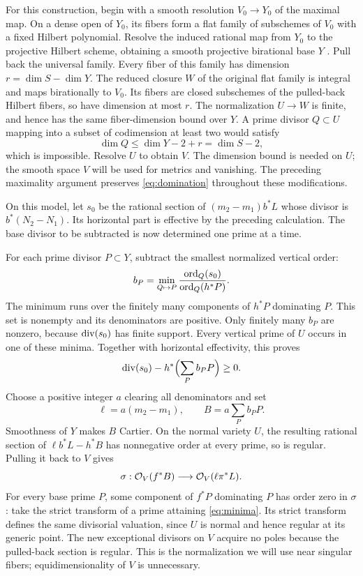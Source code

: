 For this construction, begin with a smooth resolution \(V_0\to Y_0\)
of the maximal map. On a dense open of \(Y_0\), its fibers form a
flat family of subschemes of \(V_0\) with a fixed Hilbert polynomial.
Resolve the induced rational map from \(Y_0\) to the projective
Hilbert scheme, obtaining a smooth projective birational base \(Y\)
\cite[Theorem~3.2, p.~260; p.~265]{Grothendieck1961Hilbert}.
Pull back the universal family. Every fiber of this family has
dimension \(r=\dim S-\dim Y\). The reduced closure \(W\) of the
original flat family is integral and maps birationally to \(V_0\).
Its fibers are closed subschemes of the pulled-back Hilbert fibers,
so have dimension at most \(r\). The normalization \(U\to W\)
is finite, and hence has the same fiber-dimension bound over \(Y\).
A prime divisor \(Q\subset U\) mapping into a subset of codimension
at least two would satisfy
\[
\dim Q\le \dim Y-2+r=\dim S-2,
\]
which is impossible. Resolve \(U\) to obtain \(V\). The dimension
bound is needed on \(U\); the smooth space \(V\) will be used for
metrics and vanishing. The preceding maximality argument preserves
\eqref{eq:domination} throughout these modifications.

On this model, let \(s_0\) be the rational section of
\((m_2-m_1)b^*L\) whose divisor is \(b^*(N_2-N_1)\). Its horizontal
part is effective by the preceding calculation. The base divisor to
be subtracted is now determined one prime at a time.

For each prime divisor \(P\subset Y\), subtract the smallest
normalized vertical order:
\begin{equation}\label{eq:minima}
b_P=\min_{Q\mapsto P}
\frac{\operatorname{ord}_Q(s_0)}{\operatorname{ord}_Q(h^*P)}.
\end{equation}
The minimum runs over the finitely many components of \(h^*P\)
dominating \(P\). This set is nonempty and its denominators are
positive. Only finitely many \(b_P\) are nonzero, because
\(\operatorname{div}(s_0)\) has finite support. Every vertical prime of \(U\)
occurs in one of these minima. Together with horizontal effectivity,
this proves
\[
\operatorname{div}(s_0)-h^*\Bigl(\sum_P b_PP\Bigr)\ge0.
\]
Choose a positive integer \(a\) clearing all denominators and set
\[
\ell=a(m_2-m_1),\qquad B=a\sum_Pb_PP.
\]
Smoothness of \(Y\) makes \(B\) Cartier. On the normal variety
\(U\), the resulting rational section of \(\ell b^*L-h^*B\)
has nonnegative order at every prime, so is regular. Pulling it back
to \(V\) gives
\begin{equation}\label{eq:sigma}
\sigma:\mathcal O_V(f^*B)\longrightarrow\mathcal O_V(\ell\pi^*L).
\end{equation}
For every base prime \(P\), some component of \(f^*P\) dominating
\(P\) has order zero in \(\sigma\): take the strict transform of
a prime attaining \eqref{eq:minima}. Its strict transform defines the
same divisorial valuation, since \(U\) is normal and hence regular
at its generic point. The new exceptional divisors on \(V\) acquire
no poles because the pulled-back section is regular. This is the
normalization we will use near singular fibers; equidimensionality of
\(V\) is unnecessary.

